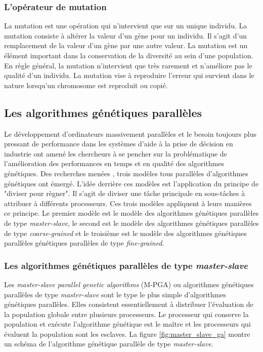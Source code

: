 	\subsubsection{L'opérateur de mutation}
	
	La mutation est une opération qui n'intervient que sur un unique individu. La mutation consiste à altérer la valeur d'un gène pour un individu. Il s'agit d'un remplacement de la valeur d'un gène par une autre valeur. La mutation est un élément important dans la conservation de la diversité au sein d'une population. En règle général, la mutation n'intervient que très rarement et n'améliore pas le qualité d'un individu. La mutation vise à reproduire l'erreur qui survient dans le nature lorsqu'un chromosome est reproduit ou copié.
	
	\subsection{Les algorithmes génétiques parallèles}
	
	Le développement d'ordinateurs massivement parallèles et le besoin toujours plus pressant de performance dans les systèmes d'aide à la prise de décision en industrie ont amené les chercheurs à se pencher sur la problématique de l'amélioration des performances en temps et en qualité des algorithmes génétiques. Des recherches menées \cite{cant2}, trois modèles tous parallèles d'algorithmes génétiques ont émergé. L'idée derrière ces modèles est l'application du principe de "diviser pour règner". Il s'agit de diviser une tâche principale en sous-tâches à attribuer à différents processeurs. Ces trois modèles appliquent à leurs manières ce principe. Le premier modèle est le modèle des algorithmes génétiques parallèles de type \emph{master-slave}, le second est le modèle des algorithmes génétiques parallèles de type \emph{coarse-grained} et le troisième est le modèle des algorithmes génétiques parallèles génétiques parallèles de type \emph{fine-grained}.
	
	\subsubsection{Les algorithmes génétiques parallèles de type \emph{master-slave}}
	
	Les \emph{master-slave parallel genetic algorithms} (M-PGA) ou algorithmes génétiques parallèles de type \emph{master-slave} sont le type le plus simple d'algorithmes génétiques parallèles. Elles consistent essentiellement à distribuer l'évaluation de la population globale entre plusieurs processeurs. Le processeur qui conserve la population et exécute l'algorithme génétique est le maître et les processeurs qui évaluent la population sont les esclaves. La figure \ref{fig:master_slave_ga} montre un schéma de l'algorithme génétique parallèle de type \emph{master-slave}. 
	

